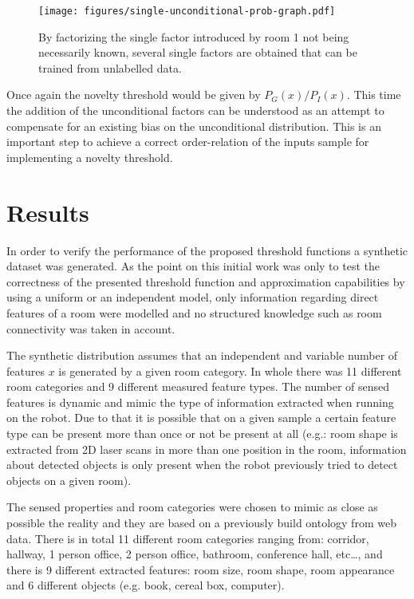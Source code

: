 \documentclass[runningheads,a4paper]{llncs}
\begin{document}
\begin{figure}[h]
\centering
\texttt{[image: figures/single-unconditional-prob-graph.pdf]}
\caption{\label{fig:single-unconditional-prob-graph}By factorizing the single factor
introduced by room 1 not being necessarily known, several single factors are obtained
that can be trained from unlabelled data.}
\end{figure}

Once again the novelty threshold would be given by $P_G(x)/P_I(x)$.
This time the addition of the unconditional factors can be understood as an
attempt to compensate for an existing bias on the unconditional distribution.
This is an important step to achieve a correct order-relation of the inputs sample
for implementing a novelty threshold.


\section{Results}
\label{sec:results}

In order to verify the performance of the proposed threshold functions a synthetic dataset
was generated. As the point on this initial work was only to test the correctness of
the presented threshold function and approximation capabilities by using a uniform or
an independent model, only information regarding direct features of a room were
modelled and no structured knowledge such as room connectivity was taken
in account.

The synthetic distribution assumes that an independent and variable number of features
$x$ is generated by a given room category.
In whole there was 11 different room categories and 9 different measured feature
types. The number of sensed features is dynamic and mimic the type of information
extracted when running on the robot. Due to that it is possible that on a given sample
a certain feature type can be present more than once or not be present at all
(e.g.: room shape is extracted from 2D laser scans in more than one position in the room,
information about detected objects is only present when the robot previously tried to
detect objects on a given room).

The sensed properties and room categories were chosen to mimic as close as possible
the reality and they are based on a previously build ontology from web data.
There is in total 11 different room categories ranging from: corridor, hallway,
1 person office, 2 person office, bathroom, conference hall, etc\dots, and there is
9 different extracted features: room size, room shape, room appearance and 6 different objects
(e.g. book, cereal box, computer).
\end{document}
